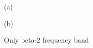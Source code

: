 \begin{figure}[h!]
\begin{minipage}[h]{0.49\linewidth}
 (a) \\
\end{minipage}
\hfill
\begin{minipage}[h]{0.5\linewidth}
 (b) \\
\end{minipage}
\caption{Only beta-2 frequency band} 
\end{figure}

